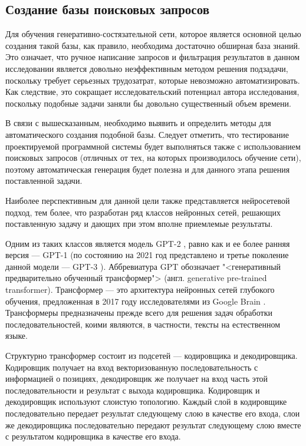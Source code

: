 \subsection{Создание базы поисковых запросов}
Для обучения генеративно-состязательной сети, которое является основной целью создания такой базы, как правило,
необходима достаточно обширная база знаний. Это означает, что ручное написание запросов и фильтрация результатов
в данном исследовании является довольно неэффективным методом решения подзадачи, поскольку требует серьезных
трудозатрат, которые невозможно автоматизировать. Как следствие, это сокращает исследовательский потенциал автора
исследования, поскольку подобные задачи заняли бы довольно существенный объем времени.

В связи с вышесказанным, необходимо выявить и определить методы для автоматического создания подобной базы.
Следует отметить, что тестирование проектируемой программной системы будет выполняться также с использованием 
поисковых запросов (отличных от тех, на которых производилось обучение сети), поэтому автоматическая генерация
будет полезна и для данного этапа решения поставленной задачи.

Наиболее перспективным для данной цели также представляется нейросетевой подход, тем более, что разработан ряд
классов нейронных сетей, решающих поставленную задачу и дающих при этом вполне приемлемые результаты.

Одним из таких классов является модель GPT-2 \cite{radford2019language}, равно как и ее более ранняя версия ---
GPT-1 \cite{Radford2018ImprovingLU} (по состоянию на 2021 год представлено и третье поколение данной модели ---
GPT-3 \cite{brown2020language}).  Аббревиатура GPT обозначает "<генеративный предварительно обученный трансформер">
(англ. generative pre-trained transformer). Трансформер --- это архитектура нейронных сетей глубокого обучения,
предложенная в 2017 году исследователями из Google Brain \cite{vaswani2017attention}. Трансформеры предназначены
прежде всего для решения задач обработки последовательностей, коими являются, в частности, тексты на естественном языке.

Структурно трансформер состоит из подсетей --- кодировщика и декодировщика. Кодировщик получает на вход векторизованную 
последовательность с информацией о позициях, декодировщик же получает на вход часть этой последовательности и результат
с выхода кодировщика. 
Кодировщик и декодировщик используют слоистую топологию. Каждый слой в кодировщике последовательно передает результат 
следующему слою в качестве его входа, слои же декодировщика последовательно передают результат следующему слою 
вместе с результатом кодировщика в качестве его входа.


